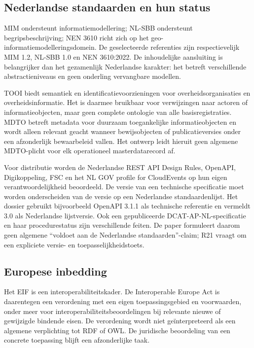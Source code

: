 \subsection{Nederlandse standaarden en hun status}
MIM ondersteunt informatiemodellering; NL-SBB ondersteunt begripsbeschrijving; NEN 3610 richt zich op het geo-informatiemodelleringsdomein. De geselecteerde referenties zijn respectievelijk MIM 1.2, NL-SBB 1.0 en NEN 3610:2022. \citep{S13,S14,S17} De inhoudelijke aansluiting is belangrijker dan het gezamenlijk Nederlandse karakter: het betreft verschillende abstractieniveaus en geen onderling vervangbare modellen.

TOOI biedt semantiek en identificatievoorzieningen voor overheidsorganisaties en overheidsinformatie. Het is daarmee bruikbaar voor verwijzingen naar actoren of informatieobjecten, maar geen complete ontologie van alle basisregistraties. \citep{S15} MDTO betreft metadata voor duurzaam toegankelijke informatieobjecten en wordt alleen relevant geacht wanneer bewijsobjecten of publicatieversies onder een afzonderlijk bewaarbeleid vallen. \citep{S24} Het ontwerp leidt hieruit geen algemene MDTO-plicht voor elk operationeel masterdatarecord af.

Voor distributie worden de Nederlandse REST API Design Rules, OpenAPI, Digikoppeling, FSC en het NL GOV profile for CloudEvents op hun eigen verantwoordelijkheid beoordeeld. \citep{S18,S19,S20,S21,S22} De versie van een technische specificatie moet worden onderscheiden van de versie op een Nederlandse standaardenlijst. Het dossier gebruikt bijvoorbeeld OpenAPI 3.1.1 als technische referentie en vermeldt 3.0 als Nederlandse lijstversie. Ook een gepubliceerde DCAT-AP-NL-specificatie en haar procedurestatus zijn verschillende feiten. De paper formuleert daarom geen algemene ``voldoet aan de Nederlandse standaarden''-claim; R21 vraagt om een expliciete versie- en toepasselijkheidstoets.

\subsection{Europese inbedding}
Het EIF is een interoperabiliteitskader. De Interoperable Europe Act is daarentegen een verordening met een eigen toepassingsgebied en voorwaarden, onder meer voor interoperabiliteitsbeoordelingen bij relevante nieuwe of gewijzigde bindende eisen. \citep{S43,S42} De verordening wordt niet geïnterpreteerd als een algemene verplichting tot RDF of OWL. De juridische beoordeling van een concrete toepassing blijft een afzonderlijke taak.

